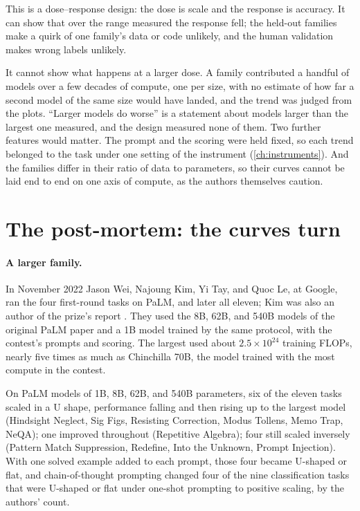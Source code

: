 \begin{refsection}
This is a dose--response design: the dose is scale and the response is accuracy. It can show that over the range measured the response fell; the held-out families make a quirk of one family's data or code unlikely, and the human validation makes wrong labels unlikely.

It cannot show what happens at a larger dose. A family contributed a handful of models over a few decades of compute, one per size, with no estimate of how far a second model of the same size would have landed, and the trend was judged from the plots. ``Larger models do worse'' is a statement about models larger than the largest one measured, and the design measured none of them. Two further features would matter. The prompt and the scoring were held fixed, so each trend belonged to the task under one setting of the instrument (\cref{ch:instruments}). And the families differ in their ratio of data to parameters, so their curves cannot be laid end to end on one axis of compute, as the authors themselves caution.

\section{The post-mortem: the curves turn}\label{sec:extrapolation:postmortem}

\paragraph{A larger family.} In November 2022 Jason Wei, Najoung Kim, Yi Tay, and Quoc Le, at Google, ran the four first-round tasks on PaLM, and later all eleven; Kim was also an author of the prize's report \parencite{WeiEtAl2023}. They used the 8B, 62B, and 540B models of the original PaLM paper and a 1B model trained by the same protocol, with the contest's prompts and scoring. The largest used about $2.5\times10^{24}$ training FLOPs, nearly five times as much as Chinchilla 70B, the model trained with the most compute in the contest.

\begin{finding}\label{fd:extrapolation:ushape}
On PaLM models of 1B, 8B, 62B, and 540B parameters, six of the eleven tasks scaled in a U shape, performance falling and then rising up to the largest model (Hindsight Neglect, Sig Figs, Resisting Correction, Modus Tollens, Memo Trap, NeQA); one improved throughout (Repetitive Algebra); four still scaled inversely (Pattern Match Suppression, Redefine, Into the Unknown, Prompt Injection). With one solved example added to each prompt, those four became U-shaped or flat, and chain-of-thought prompting changed four of the nine classification tasks that were U-shaped or flat under one-shot prompting to positive scaling, by the authors' count.
\end{finding}


\end{refsection}
